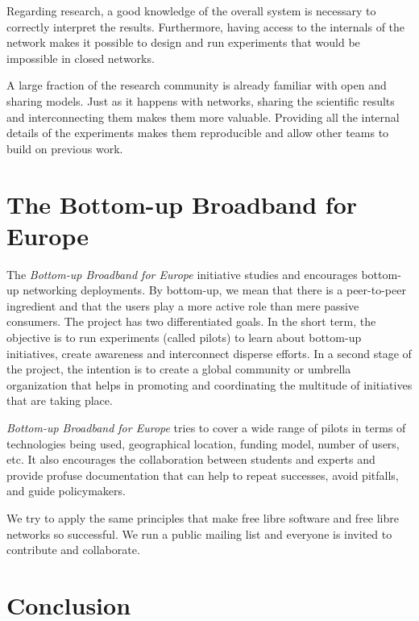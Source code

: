 \documentclass[journal]{IEEEtran}
\begin{document}
Regarding research, a good knowledge of the overall system is necessary to correctly interpret the results.
Furthermore, having access to the internals of the network makes it possible to design and run experiments that would be impossible in closed networks.

A large fraction of the research community is already familiar with open and sharing models. 
Just as it happens with networks, sharing the scientific results and interconnecting them makes them more valuable.
Providing all the internal details of the experiments makes them reproducible and allow other teams to build on previous work.


\section{The Bottom-up Broadband for Europe}

The \emph{Bottom-up Broadband for Europe} initiative studies and encourages bottom-up networking deployments.
By bottom-up, we mean that there is a peer-to-peer ingredient and that the users play a more active role than mere passive consumers.
The project has two differentiated goals.
In the short term, the objective is to run experiments (called pilots) to learn about bottom-up initiatives, create awareness and interconnect disperse efforts.
In a second stage of the project, the intention is to create a global community or umbrella organization that helps in promoting and coordinating the multitude of initiatives that are taking place.

\emph{Bottom-up Broadband for Europe} tries to cover a wide range of pilots in terms of technologies being used, geographical location, funding model, number of users, etc.
It also encourages the collaboration between students and experts and provide profuse documentation that can help to repeat successes, avoid pitfalls, and guide policymakers.

We try to apply the same principles that make free libre software and free libre networks so successful.
We run a public mailing list and everyone is invited to contribute and collaborate.

\section{Conclusion} \label{sec:conclusion}
\end{document}
